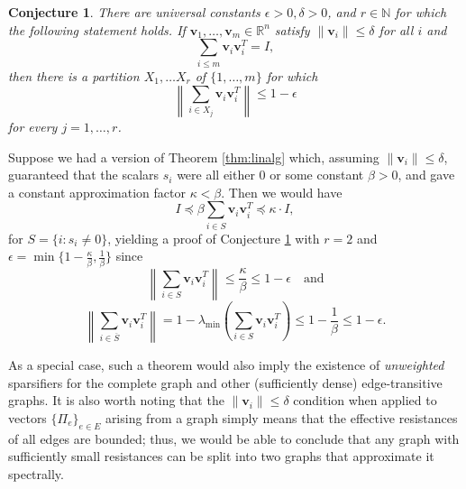 \documentclass[12pt]{article}
\newcommand{\R}{\mathbb{R}}
\newtheorem{conjecture}[theorem]{Conjecture}
\newcommand\ppi{\mathbf{v}}
\begin{document}
\begin{conjecture} \label{conj:ks} There are universal constants 
$\epsilon > 0, \delta > 0$, and $r\in \mathbb{N}$ for which the following
statement holds. If $\ppi_1,\ldots, \ppi_m\in\R^n$
satisfy $\|\ppi_i\|\le \delta$ for all $i$ and
\[\sum_{i\le m}\ppi_i\ppi_i^T = I,\]
  then there is a partition $X_1,\ldots X_r$ of $\{1,\ldots, m\}$ for which
\[\left\|\sum_{i\in X_j}\ppi_i\ppi_i^T\right\|\le 1-\epsilon\]
  for every $j=1,\ldots, r$.
\end{conjecture}

Suppose we had a version of Theorem \ref{thm:linalg} which, assuming 
$\|\ppi_i\|\le\delta$, guaranteed that the
  scalars $s_i$ were all either $0$ or some constant $\beta > 0$, and 
  gave a constant approximation factor $\kappa < \beta$.
Then we would have
\[ I \preceq \beta \sum_{i\in S} \ppi_i\ppi_i^T\preceq \kappa\cdot I,\]
 for $S=\{i:s_i\ne 0\}$, yielding
a proof of Conjecture \ref{conj:ks} with 
    $r=2$ and $\epsilon = \min \{1-\frac{\kappa}{\beta}, \frac{1}{\beta}\}$ since
    \[ \left\|\sum_{i\in {S}} \ppi_i\ppi_i^T\right\| \le \frac{\kappa}{\beta} \le
    1-\epsilon\quad\textrm{and}\]
    \[ \left\|\sum_{i\in\overline{S}} \ppi_i\ppi_i^T\right\| =
    1-\lambda_\textrm{min}\left(\sum_{i\in S}\ppi_i\ppi_i^T\right) \le
    1-\frac{1}{\beta} \le 1-\epsilon.\]

As a special case, such a theorem would also imply the existence of {\em unweighted} sparsifiers
  for the complete graph and other (sufficiently dense) edge-transitive graphs. 
It is also worth noting that the $\|\ppi_i\|\le\delta$ condition when applied to vectors $\{\Pi_e\}_{e\in E}$ arising from a graph 
  simply means that the effective resistances
  of all edges are bounded; thus, we would be able to conclude that any graph with sufficiently small resistances
  can be split into two graphs that approximate it spectrally.
\end{document}
